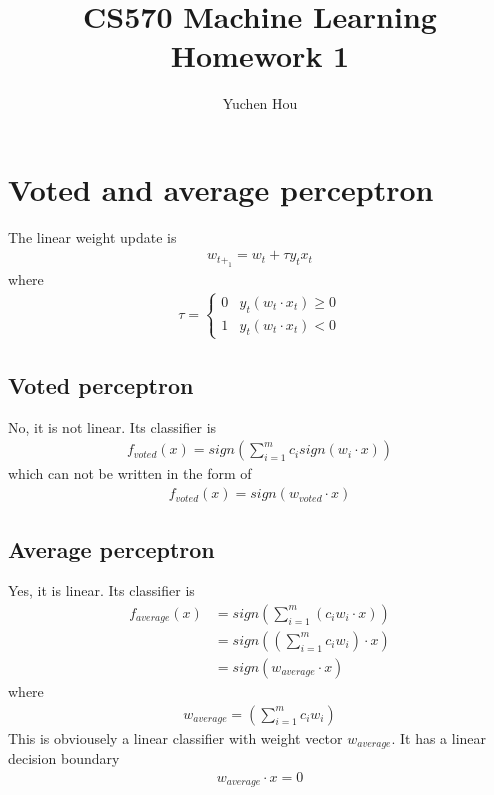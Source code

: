 \documentclass[12pt]{article}
\begin{document}
\title{CS570 Machine Learning Homework 1}
\author{Yuchen Hou}
\maketitle

\section{Voted and average perceptron}
The linear weight update is
\begin{align}
  w_{t+_1} = w_{t} + \tau y_{t} x_{t}
\end{align}
where
\begin{align}
  \tau =
  \begin{cases}
      0 & y_{t} (w_t \cdot x_{t}) \geq 0 \\
      1 & y_{t} (w_t \cdot x_{t}) < 0
  \end{cases}
\end{align}
\subsection{Voted perceptron}
No, it is not linear. Its classifier is
\begin{align}
  f_{voted}(x) = sign (\sum_{i=1}^m c_i sign(w_i \cdot x))
\end{align}
which can not be written in the form of
\begin{align}
  f_{voted}(x)= sign (w_{voted} \cdot x)
\end{align}
\subsection{Average perceptron}
Yes, it is linear. Its classifier is
\begin{align}
  f_{average}(x)
  &= sign (\sum_{i=1}^m (c_i w_i \cdot x))\\
  &= sign ((\sum_{i=1}^m c_i w_i) \cdot x)\\
  &= sign (w_{average} \cdot x)
\end{align}
where
\begin{align}
  w_{average} = (\sum_{i=1}^m c_i w_i)
\end{align}
This is obviousely a linear classifier with weight vector $w_{average}$. It has a linear decision boundary
\begin{align}
  w_{average} \cdot x = 0
\end{align}
\end{document}
